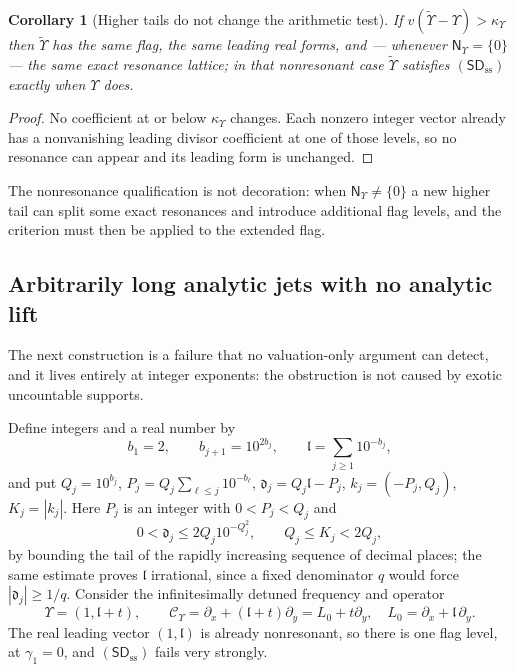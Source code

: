 \documentclass[11pt,letterpaper]{article}
\newtheorem{corollary}[corollary]{Corollary}
\theoremstyle{definition}
\theoremstyle{remark}
\newcommand{\sdss}{\mathsf{SD}_{\mathrm{ss}}}
\newcommand{\Cups}{\mathcal C_{\Upsilon}}
\newcommand{\qlat}{\mathsf N_{\Upsilon}}
\newcommand{\kups}{\kappa_{\Upsilon}}
\numberwithin{equation}{section}
\begin{document}
\begin{corollary}[Higher tails do not change the arithmetic test]
\label{dyn:cor:qptail}
If $v(\widetilde\Upsilon-\Upsilon)>\kups$ then $\widetilde\Upsilon$ has the
same flag, the same leading real forms, and --- whenever $\qlat=\{0\}$ ---
the same exact resonance lattice; in that nonresonant case
$\widetilde\Upsilon$ satisfies $(\sdss)$ exactly when $\Upsilon$ does.
\end{corollary}
\begin{proof}
No coefficient at or below $\kups$ changes. Each nonzero integer vector
already has a nonvanishing leading divisor coefficient at one of those
levels, so no resonance can appear and its leading form is unchanged.
\end{proof}

The nonresonance qualification is not decoration: when $\qlat\ne\{0\}$ a
new higher tail can split some exact resonances and introduce additional
flag levels, and the criterion must then be applied to the extended flag.

\subsection{Arbitrarily long analytic jets with no analytic lift}
\label{dyn:subsec:qpjet}

The next construction is a failure that no valuation-only argument can
detect, and it lives entirely at integer exponents: the obstruction is not
caused by exotic uncountable supports.

Define integers and a real number by
\begin{equation}\label{dyn:eq:qpliouvilleconstant}
 b_1=2,\qquad b_{j+1}=10^{2b_j},\qquad
 \mathfrak l=\sum_{j\ge1}10^{-b_j},
\end{equation}
and put $Q_j=10^{b_j}$, $P_j=Q_j\sum_{\ell\le j}10^{-b_\ell}$,
$\mathfrak d_j=Q_j\mathfrak l-P_j$, $k_j=(-P_j,Q_j)$, $K_j=|k_j|$. Here
$P_j$ is an integer with $0<P_j<Q_j$ and
\begin{equation}\label{dyn:eq:qpliouville}
 0<\mathfrak d_j\le2Q_j10^{-Q_j^{2}},\qquad Q_j\le K_j<2Q_j ,
\end{equation}
by bounding the tail of the rapidly increasing sequence of decimal places;
the same estimate proves $\mathfrak l$ irrational, since a fixed
denominator $q$ would force $|\mathfrak d_j|\ge1/q$. Consider the
infinitesimally detuned frequency and operator
\begin{equation}\label{dyn:eq:qpdetuned}
 \Upsilon=(1,\mathfrak l+t),\qquad
 \Cups=\partial_x+(\mathfrak l+t)\partial_y=L_0+t\partial_y,
 \quad L_0=\partial_x+\mathfrak l\,\partial_y .
\end{equation}
The real leading vector $(1,\mathfrak l)$ is already nonresonant, so there
is one flag level, at $\gamma_1=0$, and $(\sdss)$ fails very strongly.
\end{document}
